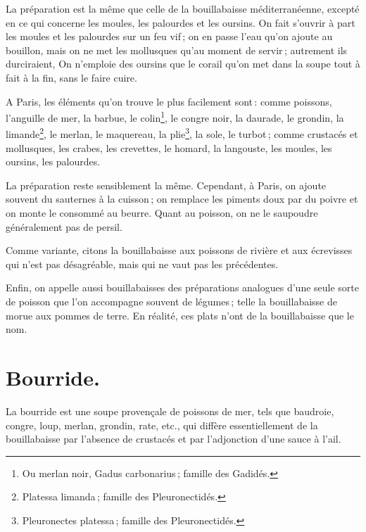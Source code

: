 La préparation est la même que celle de la bouillabaisse méditerranéenne,
excepté en ce qui concerne les moules, les palourdes et les oursins. On fait
s'ouvrir à part les moules et les palourdes sur un feu vif ; on en passe l'eau
qu’on ajoute au bouillon, mais on ne met les mollusques qu'au moment de
servir ; autrement ils durciraient, On n'emploie des oursins que le corail
qu'on met dans la soupe tout à fait à la fin, sans le faire cuire.

A Paris, les éléments qu'on trouve le plus facilement sont : comme poissons,
l'anguille de mer, la barbue, le colin\footnote{Ou merlan noir, Gadus
carbonarius ; famille des Gadidés.}, le congre noir, la daurade, le grondin, la
limande\footnote{Platessa limanda ; famille des Pleuronectidés.}, le merlan, le
maquereau, la plie\footnote{ Pleuronectes platessa ; famille des
Pleuronectidés.}, la sole, le turbot ; comme crustacés et mollusques, les
crabes, les crevettes, le homard, la langouste, les moules, les oursins, les
palourdes.

La préparation reste sensiblement la même. Cependant, à Paris, on ajoute
souvent du sauternes à la cuisson ; on remplace les piments doux par du poivre
et on monte le consommé au beurre. Quant au poisson, on ne le saupoudre
généralement pas de persil.

\sk

Comme variante, citons la bouillabaisse aux poissons de rivière et aux
écrevisses qui n’est pas désagréable, mais qui ne vaut pas les précédentes.

\sk

Enfin, on appelle aussi bouillabaisses des préparations analogues d'une seule
sorte de poisson que l’on accompagne souvent de légumes ; telle la
bouillabaisse de morue aux pommes de terre. En réalité, ces plats n'ont de la
bouillabaisse que le nom.

\section*{\centering Bourride.}

La bourride est une soupe provençale de poissons de mer, tels que baudroie,
congre, loup, merlan, grondin, rate, etc., qui diffère essentiellement de la
bouillabaisse par l'absence de crustacés et par l'adjonction d'une sauce
à l'ail.

